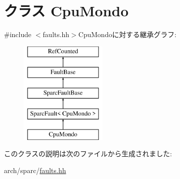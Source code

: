 \hypertarget{classSparcISA_1_1CpuMondo}{
\section{クラス CpuMondo}
\label{classSparcISA_1_1CpuMondo}
}


{\ttfamily \#include $<$faults.hh$>$}CpuMondoに対する継承グラフ:\begin{figure}[H]
\begin{center}
\leavevmode
\includegraphics[height=5cm]{classSparcISA_1_1CpuMondo}
\end{center}
\end{figure}


このクラスの説明は次のファイルから生成されました:\begin{DoxyCompactItemize}
\item 
arch/sparc/\hyperlink{arch_2sparc_2faults_8hh}{faults.hh}\end{DoxyCompactItemize}
